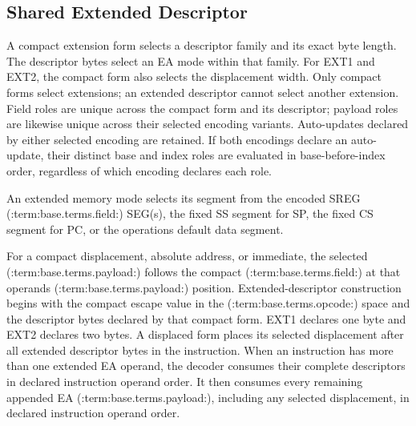 \subsection{Shared Extended Descriptor}
A compact extension form selects a descriptor family and its exact byte length. The descriptor bytes select an EA mode
within that family. For EXT1 and EXT2, the compact form also selects the displacement width.
Only compact forms select extensions; an extended descriptor cannot select another extension.
Field roles are unique across the compact form and its descriptor; payload roles are likewise unique across their selected encoding variants.
Auto-updates declared by either selected encoding are retained. If both encodings declare an auto-update,
their distinct base and index roles are evaluated in base-before-index order, regardless of which encoding declares each role.

An extended memory mode selects its segment from the encoded SREG (:term:base.terms.field:) SEG(s), the fixed SS segment for SP, the fixed CS
segment for PC, or the operation\textquotesingle{}s default data segment.

For a compact displacement, absolute address, or immediate, the selected (:term:base.terms.payload:) follows the compact (:term:base.terms.field:) at that
operand\textquotesingle{}s (:term:base.terms.payload:) position. Extended-descriptor construction begins with the compact escape value in the (:term:base.terms.opcode:)
space and the descriptor bytes declared by that compact form. EXT1 declares one byte and EXT2 declares two bytes.
A displaced form places its selected displacement after
all extended descriptor bytes in the instruction. When an instruction has more than one extended EA operand, the decoder consumes
their complete descriptors in declared instruction operand order. It then consumes every remaining appended EA (:term:base.terms.payload:),
including any selected displacement, in declared instruction operand order.

\clearpage
